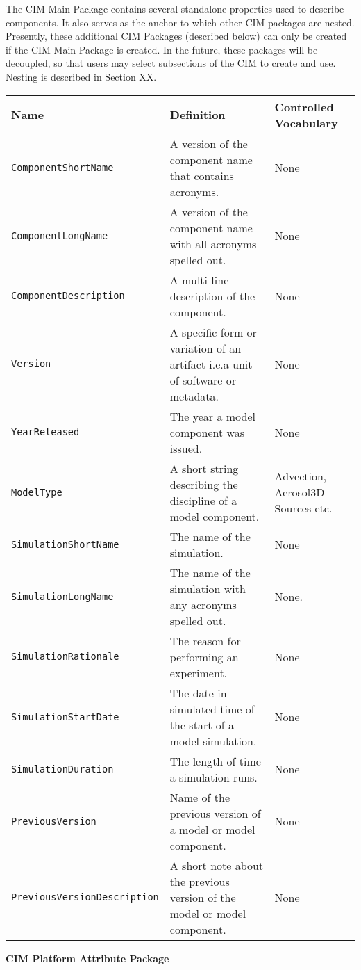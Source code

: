 The CIM Main Package contains several standalone properties used to describe components. It also serves as the anchor to which other CIM packages are nested. Presently, these additional CIM Packages (described below) can only be created if the CIM Main Package is created. In the future, these packages will be decoupled, so that users may select subsections of the CIM to create and use. Nesting is described in Section XX.



\begin{tabular}{|p{8cm}|p{20cm}|p{10cm}}
     {\bf Name} & {\bf Definition} & {\bf Controlled Vocabulary}\\
     \hline\hline
     {\tt ComponentShortName} & A version of the component name that contains acronyms. & None \\
     {\tt ComponentLongName} & A version of the component name with all acronyms spelled out. & None\\
     {\tt ComponentDescription} & A multi-line description of the component. & None \\
     {\tt Version} &  A specific form or variation of an artifact i.e.a unit of software or metadata. & None\\
     {\tt YearReleased} & The year a model component was issued. & None \\
     {\tt ModelType} & A short string describing the discipline of a model component. & Advection, Aerosol3D-Sources etc.\\
     {\tt SimulationShortName} & The name of the simulation. & None \\
     {\tt SimulationLongName} & The name of the simulation with any acronyms spelled out. & None. \\ 
     {\tt SimulationRationale} & The reason for performing an experiment. & None\\
     {\tt SimulationStartDate} & The date in simulated time of the start of a model simulation. & None\\ 
     {\tt SimulationDuration} & The length of time a simulation runs.&  None\\ 
     {\tt PreviousVersion} & Name of the previous version of a model or model component. & None\\ 
     {\tt PreviousVersionDescription} &  A short note about the previous version of the model or model component. & None \\ 
\end{tabular}


{\bf CIM Platform Attribute Package}

